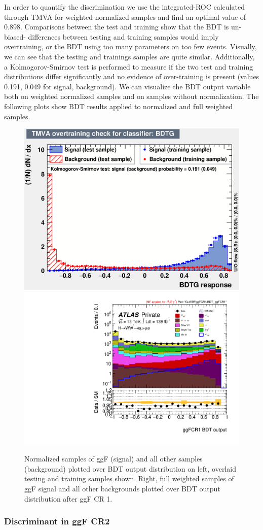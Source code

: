 In order to quantify the discrimination we use the integrated-ROC calculated through TMVA for weighted normalized samples and find an optimal value of 0.898. Comparisons between the test and training show that the BDT is un-biased- differences between testing and training samples would imply overtraining, or the BDT using too many parameters on too few events. Visually, we can see that the testing and trainings samples are quite similar. Additionally, a Kolmogorov-Smirnov test is performed to measure if the two test and training distributions differ significantly and no evidence of over-training is present (values 0.191, 0.049 for signal, background). We can visualize the BDT output variable both on weighted normalized samples and on samples without normalization. The following plots show BDT results applied to normalized and full weighted samples.

\begin{figure}[!htbp]
\centering
  \includegraphics[width=.45\linewidth]{Pictures/ggFCR1/overtrain_BDTG.eps}
  \includegraphics[width=.35\linewidth]{Pictures/run2-emme-CutVBFggFCR1-BDT_ggFCR1-log.pdf}
\caption{Normalized samples of ggF (signal) and all other samples (background) plotted over BDT output distribution on left, overlaid testing and training samples shown. Right, full weighted samples of ggF signal and all other backgrounds plotted over BDT output distribution after ggF CR 1.}
\label{fig:ggFCR1BDTresult}
\end{figure}

\subsubsection{Discriminant in ggF CR2}

